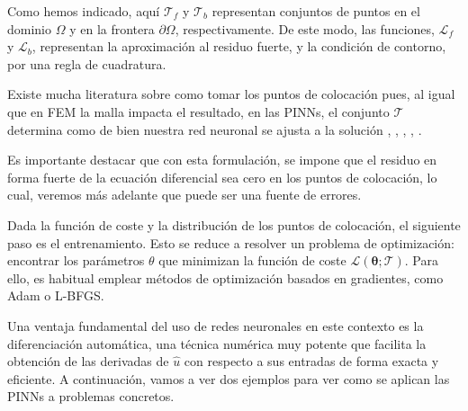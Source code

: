 \documentclass[a4paper,11pt,spanish, twoside, leqno]{tfg-uam}
\theoremstyle{definition}
\begin{document}
Como hemos indicado, aquí $\mathcal{T}_f$ y $\mathcal{T}_b$ representan conjuntos de puntos en el dominio $\Omega$ y en la frontera $\partial\Omega$, respectivamente. De este modo, las funciones, $\mathcal{L}_f$ y $\mathcal{L}_b$, representan la aproximación al residuo fuerte, y la condición de contorno, por una regla de cuadratura. 



Existe mucha literatura sobre como tomar los puntos de colocación pues, al igual que en FEM la malla impacta el resultado, en las PINNs, el conjunto $\mathcal{T}$ determina como de bien nuestra red neuronal se ajusta a la solución \cite{münzer2022curriculumtrainingbasedstrategydistributingcollocation}, \cite{aikawa2024improving}, \cite{matsubara2023goodlatticetrainingphysicsinformed}, \cite{subramanian2022adaptiveselfsupervisionalgorithmsphysicsinformed}, \cite{hou2023enhancing}.  

Es importante destacar que con esta formulación, se impone que el residuo en forma fuerte de la ecuación diferencial sea cero en los puntos de colocación, lo cual, veremos más adelante que puede ser una fuente de errores. 

Dada la función de coste y la distribución de los puntos de colocación, el siguiente paso es el entrenamiento. Esto se reduce a resolver un problema de optimización: encontrar los parámetros $\theta$ que minimizan la función de coste $\mathcal{L}(\boldsymbol{\theta}; \mathcal{T})$. Para ello, es habitual emplear métodos de optimización basados en gradientes, como Adam o L-BFGS. 

Una ventaja fundamental del uso de redes neuronales en este contexto es la diferenciación automática, una técnica numérica muy potente que facilita la obtención de las derivadas de $\hat{u}$ con respecto a sus entradas de forma exacta y eficiente.
A continuación, vamos a ver dos ejemplos para ver como se aplican las PINNs a problemas concretos.
\end{document}
